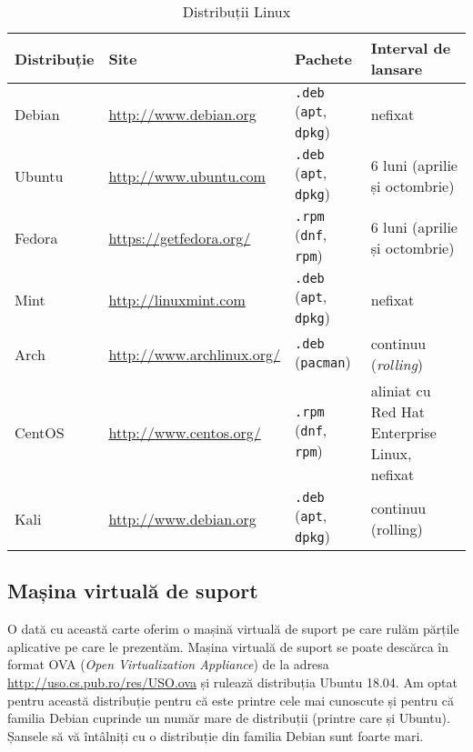 \begin{table}[!htb]
  \begin{center}
    \begin{tabular}{ p{} p{} p{} p{} }
      \toprule
        \textbf{Distribuție} &
        \textbf{Site} &
        \textbf{Pachete} &
        \textbf{Interval de lansare} \\
      \midrule
        Debian &
        \url{http://www.debian.org} &
        \texttt{.deb} (\texttt{apt}, \texttt{dpkg}) &
        nefixat \\
      \midrule
        Ubuntu &
        \url{http://www.ubuntu.com} &
        \texttt{.deb} (\texttt{apt}, \texttt{dpkg}) &
        6 luni (aprilie și octombrie) \\
      \midrule
        Fedora &
        \url{https://getfedora.org/} &
        \texttt{.rpm} (\texttt{dnf}, \texttt{rpm}) &
        6 luni (aprilie și octombrie) \\
      \midrule
        Mint &
        \url{http://linuxmint.com} &
        \texttt{.deb} (\texttt{apt}, \texttt{dpkg}) &
        nefixat \\
      \midrule
        Arch &
        \url{http://www.archlinux.org/} &
        \texttt{.deb} (\texttt{pacman}) &
        continuu (\textit{rolling}) \\
      \midrule
        CentOS &
        \url{http://www.centos.org/} &
        \texttt{.rpm} (\texttt{dnf}, \texttt{rpm}) &
        aliniat cu Red Hat Enterprise Linux, nefixat \\
      \midrule
        Kali &
        \url{http://www.debian.org} &
        \texttt{.deb} (\texttt{apt}, \texttt{dpkg}) &
        continuu (rolling) \\
      \bottomrule
    \end{tabular}
  \end{center}
  \caption{Distribuții Linux}
  \label{tab:intro:distro}
\end{table}

\subsection{Mașina virtuală de suport}
\label{sec:intro:vm}

O dată cu această carte oferim o mașină virtuală de suport pe care rulăm părțile aplicative pe care le prezentăm.
Mașina virtuală de suport se poate descărca în format OVA  (\textit{Open Virtualization Appliance}) de la adresa \url{http://uso.cs.pub.ro/res/USO.ova} și rulează distribuția Ubuntu 18.04.
Am optat pentru această distribuție pentru că este printre cele mai cunoscute și pentru că familia Debian cuprinde un număr mare de distribuții (printre care și Ubuntu).
Șansele să vă întâlniți cu o distribuție din familia Debian sunt foarte mari.

